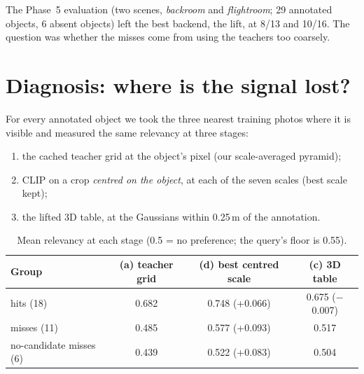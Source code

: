 \documentclass[11pt,a4paper]{article}
\begin{document}
The Phase~5 evaluation (two scenes, \emph{backroom} and \emph{flightroom}; 29 annotated objects, 6 absent objects)
left the best backend, the lift, at 8/13 and 10/16. The question was whether the misses come from using the
teachers too coarsely.

\section{Diagnosis: where is the signal lost?}

For every annotated object we took the three nearest training photos where it is visible and measured the same
relevancy at three stages:
\begin{enumerate}[label=(\alph*)]
  \item the cached teacher grid at the object's pixel (our scale-averaged pyramid);
  \item[(d)] CLIP on a crop \emph{centred on the object}, at each of the seven scales (best scale kept);
  \item[(c)] the lifted 3D table, at the Gaussians within 0.25\,m of the annotation.
\end{enumerate}

\begin{table}[ht]
\centering\small
\begin{tabular}{@{}lccc@{}}
\toprule
Group & (a) teacher grid & (d) best centred scale & (c) 3D table \\
\midrule
hits (18)                & 0.682 & 0.748 (+0.066) & 0.675 ($-$0.007) \\
misses (11)              & 0.485 & 0.577 (+0.093) & 0.517 \\
no-candidate misses (6)  & 0.439 & 0.522 (+0.083) & 0.504 \\
\bottomrule
\end{tabular}
\caption{Mean relevancy at each stage (0.5 = no preference; the query's floor is 0.55).}
\end{table}
\end{document}
